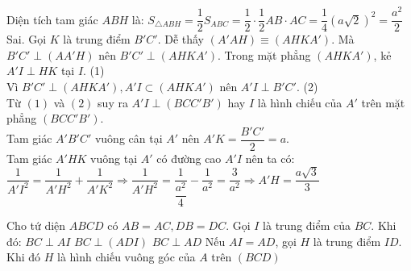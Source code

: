 \begin{ex}
{\begin{itemchoice}
			Diện tích tam giác $A B H$ là:
			$S_{\triangle A B H}=\dfrac{1}{2} S_{A B C}=\dfrac{1}{2} \cdot \dfrac{1}{2} A B \cdot A C=\dfrac{1}{4}(a \sqrt{2})^2=\dfrac{a^2}{2}$
			\itemch Sai. Gọi $K$ là trung điểm $B' C'$. Dễ thấy $\left(A' A H\right) \equiv\left(A H K A'\right)$.
			Mà $B' C' \perp\left(A A' H\right)$ nên $B' C' \perp\left(A H K A'\right)$.
			Trong mặt phẳng $\left(A H K A'\right)$, kẻ $A' I \perp H K$ tại $I$. (1)\\
			Vì $B' C' \perp\left(A H K A'\right), A' I \subset\left(A H K A'\right)$ nên $A' I \perp B' C'$. (2)\\
			Từ $(1)$ và $(2)$ suy ra $A' I \perp\left(B C C' B'\right)$ hay $I$ là hình chiếu của $A'$ trên mặt phẳng $\left(B C C' B'\right)$.\\
			Tam giác $A' B' C'$ vuông cân tại $A'$ nên $A' K=\dfrac{B' C'}{2}=a$.\\
			Tam giác $A' H K$ vuông tại $A'$ có đường cao $A' I$ nên ta có:\\
			$\dfrac{1}{A' I^2}=\dfrac{1}{A' H^2}+\dfrac{1}{A' K^2} \Rightarrow \dfrac{1}{A' H^2}=\dfrac{1}{\dfrac{a^2}{4}}-\dfrac{1}{a^2}=\dfrac{3}{a^2} \Rightarrow A' H=\dfrac{a \sqrt{3}}{3}$
		\end{itemchoice}
	}
\end{ex}
\begin{ex}  %
	Cho tứ diện $A B C D$ có $A B=A C, D B=D C$. Gọi $I$ là trung điểm của $B C$. Khi đó:
	\choiceTF
	{\True $B C \perp A I$}
	{\True $B C \perp(A D I)$}
	{\True $B C \perp A D$}
	{\True Nếu $A I=A D$, gọi $H$ là trung điểm $I D$. Khi đó $H$ là hình chiếu vuông góc của $A$ trên $(B C D)$}
\end{ex}
